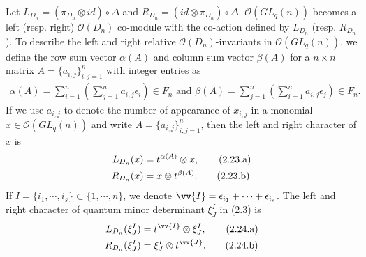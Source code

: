 \documentclass[table,a4paper,reqno]{amsart}
\numberwithin{equation}{section}
\theoremstyle{definition}
\begin{document}
Let $L_{D_n}=(\pi_{D_n}\otimes id)\circ\Delta$ and $R_{D_n}=(id\otimes\pi_{D_n})\circ\Delta$. $\mathcal{O}(GL_q(n))$ becomes a left (resp. right) $\mathcal{O}(D_n)$ co-module with the co-action defined by $L_{D_n}$ (resp. $R_{D_n}$). To describe the left and right relative $\mathcal{O}(D_n)$-invariants in $\mathcal{O}(GL_q(n))$, we define the row sum vector $\alpha(A)$ and column sum vector $\beta(A)$ for a $n\times n$ matrix $A=\{a_{i,j}\}_{i,j=1}^n$ with integer entries as
\begin{align}
    \alpha(A)=\sum_{i=1}^n\left(\sum_{j=1}^na_{i,j}\epsilon_i\right)\in F_n\text{ and }\beta(A)=\sum_{j=1}^n\left(\sum_{i=1}^na_{i,j}\epsilon_j\right)\in F_n.\label{eq:2.23}
\end{align}
If we use $a_{i,j}$ to denote the number of appearance of $x_{i,j}$ in a monomial $x\in \mathcal{O}(GL_q(n))$ and write $A=\{a_{i,j}\}_{i,j=1}^n$, then the left and right character of $x$ is
\begin{align}\stepcounter{equation}
    L_{D_n}(x)&=t^{\alpha(A)}\otimes x,\tag{2.23.a}\label{eq:2.24.a}\\
    R_{D_n}(x)&=x\otimes t^{\beta(A)}.\tag{2.23.b}\label{eq:2.24.b}
\end{align}
If $I=\{i_1,\cdots,i_s\}\subset \{1,\cdots,n\}$, we denote $\vv{I}=\epsilon_{i_1}+\cdots+\epsilon_{i_s}$. The left and right character of quantum minor determinant $\xi_J^I$ in (2.3) is
\begin{align}\stepcounter{equation}
    L_{D_n}(\xi_J^I)&=t^{\vv{I}}\otimes \xi_J^I,\tag{2.24.a}\label{eq:2.25.a}\\
    R_{D_n}(\xi_J^I)&=\xi_J^I\otimes t^{\vv{J}}.\tag{2.24.b}\label{eq:2.25.b}
\end{align}
\end{document}
